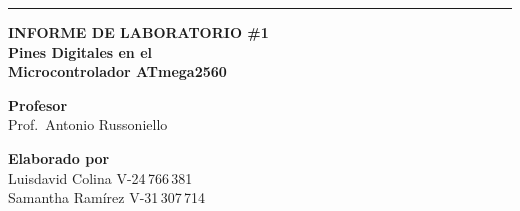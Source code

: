 \documentclass[11pt,a4paper]{article}
\begin{document}
\begin{titlepage}
                                                                                        \vspace{0.4cm}
                                                                                        {\color{ucvblue}\rule{\linewidth}{2pt}}

                                                                                        \vspace{3.5cm}
                                                                                        \begin{center}
                                                                                          {\fontsize{13}{16}\selectfont\bfseries INFORME DE LABORATORIO \#1}\\[1.2cm]
                                                                                            {\fontsize{20}{26}\selectfont\bfseries Pines Digitales en el\\[0.4cm]
                                                                                               Microcontrolador ATmega2560}
                                                                                               \end{center}

                                                                                               \vspace{3.5cm}
                                                                                               \noindent
                                                                                               \begin{minipage}[t]{0.48\textwidth}
                                                                                                 {\bfseries Profesor}\\[0.3cm]
                                                                                                   Prof.\ Antonio Russoniello
                                                                                                   \end{minipage}\hfill
                                                                                                   \begin{minipage}[t]{0.48\textwidth}\raggedleft
                                                                                                     {\bfseries Elaborado por}\\[0.3cm]
                                                                                                       Luisdavid Colina \quad V-24\,766\,381\\[0.15cm]
                                                                                                         Samantha Ram\'irez \quad V-31\,307\,714
                                                                                                         \end{minipage}


\end{titlepage}
\end{document}
